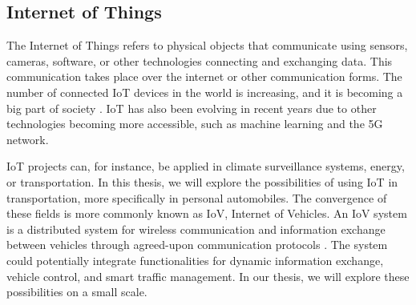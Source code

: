 \subsection{Internet of Things}

The Internet of Things refers to physical objects that communicate using sensors, cameras, software, or other technologies connecting and exchanging data. This communication takes place over the internet or other communication forms. The number of connected IoT devices in the world is increasing, and it is becoming a big part of society \parencite{iot_analytics}. IoT has also been evolving in recent years due to other technologies becoming more accessible, such as machine learning and the 5G network.

IoT projects can, for instance, be applied in climate surveillance systems, energy, or transportation. In this thesis, we will explore the possibilities of using IoT in transportation, more specifically in personal automobiles. The convergence of these fields is more commonly known as IoV, Internet of Vehicles. An IoV system is a distributed system for wireless communication and information exchange between vehicles through agreed-upon communication protocols \parencite{chinese_iov}. The system could potentially integrate functionalities for dynamic information exchange, vehicle control, and smart traffic management. In our thesis, we will explore these possibilities on a small scale.